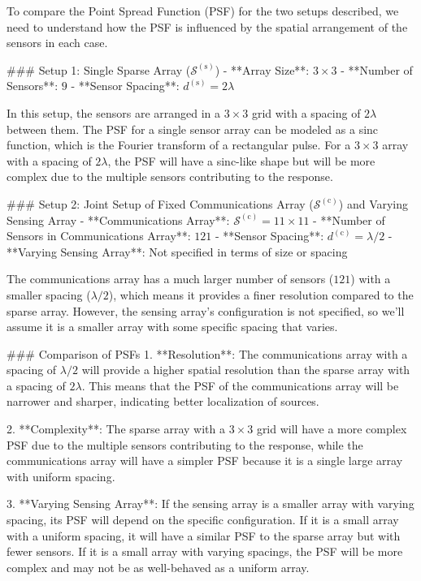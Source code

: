 To compare the Point Spread Function (PSF) for the two setups described, we need to understand how the PSF is influenced by the spatial arrangement of the sensors in each case.

### Setup 1: Single Sparse Array (\(\mathcal{S}^{(\text{s})}\))
- **Array Size**: \(3 \times 3\)
- **Number of Sensors**: \(9\)
- **Sensor Spacing**: \(d^{(\text{s})} = 2\lambda\)

In this setup, the sensors are arranged in a \(3 \times 3\) grid with a spacing of \(2\lambda\) between them. The PSF for a single sensor array can be modeled as a sinc function, which is the Fourier transform of a rectangular pulse. For a \(3 \times 3\) array with a spacing of \(2\lambda\), the PSF will have a sinc-like shape but will be more complex due to the multiple sensors contributing to the response.

### Setup 2: Joint Setup of Fixed Communications Array (\(\mathcal{S}^{(\text{c})}\)) and Varying Sensing Array
- **Communications Array**: \(\mathcal{S}^{(\text{c})} = 11 \times 11\)
- **Number of Sensors in Communications Array**: \(121\)
- **Sensor Spacing**: \(d^{(\text{c})} = \lambda/2\)
- **Varying Sensing Array**: Not specified in terms of size or spacing

The communications array has a much larger number of sensors (\(121\)) with a smaller spacing (\(\lambda/2\)), which means it provides a finer resolution compared to the sparse array. However, the sensing array's configuration is not specified, so we'll assume it is a smaller array with some specific spacing that varies.

### Comparison of PSFs
1. **Resolution**: The communications array with a spacing of \(\lambda/2\) will provide a higher spatial resolution than the sparse array with a spacing of \(2\lambda\). This means that the PSF of the communications array will be narrower and sharper, indicating better localization of sources.
   
2. **Complexity**: The sparse array with a \(3 \times 3\) grid will have a more complex PSF due to the multiple sensors contributing to the response, while the communications array will have a simpler PSF because it is a single large array with uniform spacing.

3. **Varying Sensing Array**: If the sensing array is a smaller array with varying spacing, its PSF will depend on the specific configuration. If it is a small array with a uniform spacing, it will have a similar PSF to the sparse array but with fewer sensors. If it is a small array with varying spacings, the PSF will be more complex and may not be as well-behaved as a uniform array.

